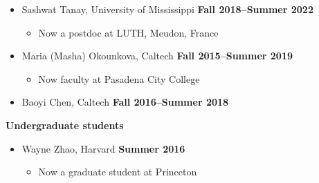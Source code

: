 \documentclass[margin,line]{res}
\begin{document}
\begin{resume}
\begin{itemize}
    \item[] Sashwat Tanay, University of Mississippi
      \hfill {\bf Fall 2018--Summer 2022}
      \begin{itemize}
        \vspace{-.05in}
        \item[] Now a postdoc at LUTH, Meudon, France
      \end{itemize}
    \item[] Maria (Masha) Okounkova, Caltech
      \hfill {\bf Fall 2015--Summer 2019}
      \begin{itemize}
        \vspace{-.05in}
        \item[] Now faculty at Pasadena City College
      \end{itemize}
    \item[] Baoyi Chen, Caltech
      \hfill {\bf Fall 2016--Summer 2018}
  \end{itemize}
  {\bf Undergraduate students}
  \begin{itemize}
    \item[] Wayne Zhao, Harvard
      \hfill {\bf Summer 2016}
      \begin{itemize}
        \vspace{-.05in}
        \item[] Now a graduate student at Princeton
      \end{itemize}
  \end{itemize}


\end{resume}
\end{document}
